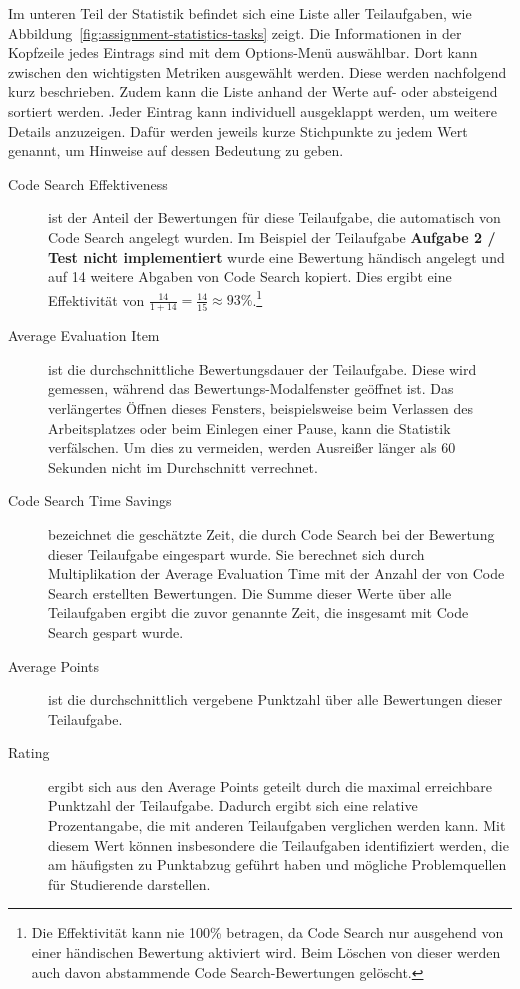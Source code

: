 Im unteren Teil der Statistik befindet sich eine Liste aller Teilaufgaben, wie Abbildung~\ref{fig:assignment-statistics-tasks} zeigt.
Die Informationen in der Kopfzeile jedes Eintrags sind mit dem Options-Menü auswählbar.
Dort kann zwischen den wichtigsten Metriken ausgewählt werden.
Diese werden nachfolgend kurz beschrieben.
Zudem kann die Liste anhand der Werte auf- oder absteigend sortiert werden.
Jeder Eintrag kann individuell ausgeklappt werden, um weitere Details anzuzeigen.
Dafür werden jeweils kurze Stichpunkte zu jedem Wert genannt, um Hinweise auf dessen Bedeutung zu geben.

\begin{description}
    \item[Code Search Effektiveness] ist der Anteil der Bewertungen für diese Teilaufgabe, die automatisch von Code Search angelegt wurden.
    Im Beispiel der Teilaufgabe \textbf{Aufgabe 2 / Test nicht implementiert} wurde eine Bewertung händisch angelegt und auf 14 weitere Abgaben von Code Search kopiert.
    Dies ergibt eine Effektivität von $\frac{14}{1 + 14} = \frac{14}{15} \approx 93\%$.\footnote{
        Die Effektivität kann nie 100\% betragen, da Code Search nur ausgehend von einer händischen Bewertung aktiviert wird.
        Beim Löschen von dieser werden auch davon abstammende Code Search-Bewertungen gelöscht.
    }
    \item[Average Evaluation Item] ist die durchschnittliche Bewertungsdauer der Teilaufgabe.
    Diese wird gemessen, während das Bewertungs-Modalfenster geöffnet ist.
    Das verlängertes Öffnen dieses Fensters, beispielsweise beim Verlassen des Arbeitsplatzes oder beim Einlegen einer Pause, kann die Statistik verfälschen.
    Um dies zu vermeiden, werden Ausreißer länger als 60 Sekunden nicht im Durchschnitt verrechnet.
    \item[Code Search Time Savings] bezeichnet die geschätzte Zeit, die durch Code Search bei der Bewertung dieser Teilaufgabe eingespart wurde.
    Sie berechnet sich durch Multiplikation der Average Evaluation Time mit der Anzahl der von Code Search erstellten Bewertungen.
    Die Summe dieser Werte über alle Teilaufgaben ergibt die zuvor genannte Zeit, die insgesamt mit Code Search gespart wurde.
    \item[Average Points] ist die durchschnittlich vergebene Punktzahl über alle Bewertungen dieser Teilaufgabe.
    \item[Rating] ergibt sich aus den Average Points geteilt durch die maximal erreichbare Punktzahl der Teilaufgabe.
    Dadurch ergibt sich eine relative Prozentangabe, die mit anderen Teilaufgaben verglichen werden kann.
    Mit diesem Wert können insbesondere die Teilaufgaben identifiziert werden, die am häufigsten zu Punktabzug geführt haben und mögliche Problemquellen für Studierende darstellen.
\end{description}

